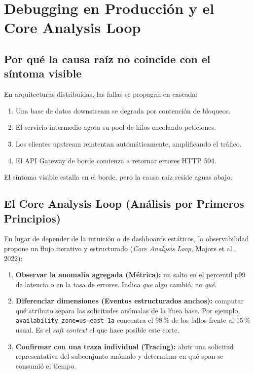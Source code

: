 \documentclass[variant=apuntes,cover=institutional,mode=screen]{ua-engineering-v6-article}
\begin{document}
\section{Debugging en Producción y el Core Analysis Loop}

\subsection{Por qué la causa raíz no coincide con el síntoma visible}
En arquitecturas distribuidas, las fallas se propagan en cascada:
\begin{enumerate}
\item Una base de datos downstream se degrada por contención de bloqueos.
\item El servicio intermedio agota su pool de hilos encolando peticiones.
\item Los clientes upstream reintentan automáticamente, amplificando el tráfico.
\item El API Gateway de borde comienza a retornar errores HTTP 504.
\end{enumerate}

El síntoma visible estalla en el borde, pero la causa raíz reside aguas abajo.

\subsection{El Core Analysis Loop (Análisis por Primeros Principios)}
En lugar de depender de la intuición o de dashboards estáticos, la observabilidad propone un flujo iterativo y estructurado (\emph{Core Analysis Loop}, Majors et al., 2022):

\begin{enumerate}
\item \textbf{Observar la anomalía agregada (Métrica):} un salto en el percentil p99 de latencia o en la tasa de errores. Indica \emph{que} algo cambió, no \emph{qué}.
\item \textbf{Diferenciar dimensiones (Eventos estructurados anchos):} computar qué atributo separa las solicitudes anómalas de la línea base. Por ejemplo, \texttt{availability\_zone=us-east-1a} concentra el 98\,\% de los fallos frente al 15\,\% usual. Es el \emph{soft context} el que hace posible este corte.
\item \textbf{Confirmar con una traza individual (Tracing):} abrir una solicitud representativa del subconjunto anómalo y determinar en qué span se consumió el tiempo.
\end{enumerate}
\end{document}
